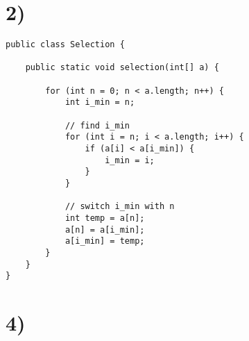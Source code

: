 \documentclass[12pt]{article}
\date{}
\begin{document}
\section{2)}
\begin{lstlisting}
public class Selection {

    public static void selection(int[] a) {

        for (int n = 0; n < a.length; n++) {
            int i_min = n;

            // find i_min
            for (int i = n; i < a.length; i++) {
                if (a[i] < a[i_min]) {
                    i_min = i;
                }
            }

            // switch i_min with n
            int temp = a[n];
            a[n] = a[i_min];
            a[i_min] = temp;
        }
    }
}
\end{lstlisting}

\pagebreak

\section{4)}
\end{document}
